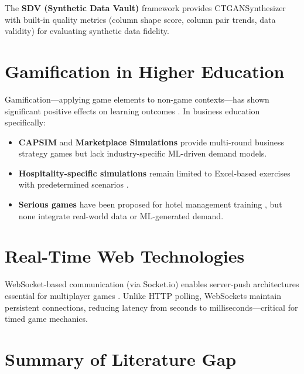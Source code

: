 \documentclass[12pt,a4paper,openany]{report}
\begin{document}
The \textbf{SDV (Synthetic Data Vault)} framework \cite{patki2016} provides CTGANSynthesizer with built-in quality metrics (column shape score, column pair trends, data validity) for evaluating synthetic data fidelity.

\section{Gamification in Higher Education}

Gamification---applying game elements to non-game contexts---has shown significant positive effects on learning outcomes \cite{hamari2014}. In business education specifically:

\begin{itemize}
  \item \textbf{CAPSIM} and \textbf{Marketplace Simulations} provide multi-round business strategy games but lack industry-specific ML-driven demand models.
  \item \textbf{Hospitality-specific simulations} remain limited to Excel-based exercises with predetermined scenarios \cite{kim2015}.
  \item \textbf{Serious games} have been proposed for hotel management training \cite{ampatzoglou2010}, but none integrate real-world data or ML-generated demand.
\end{itemize}

\section{Real-Time Web Technologies}

WebSocket-based communication (via Socket.io) enables server-push architectures essential for multiplayer games \cite{fette2011}. Unlike HTTP polling, WebSockets maintain persistent connections, reducing latency from seconds to milliseconds---critical for timed game mechanics.

\section{Summary of Literature Gap}
\end{document}
